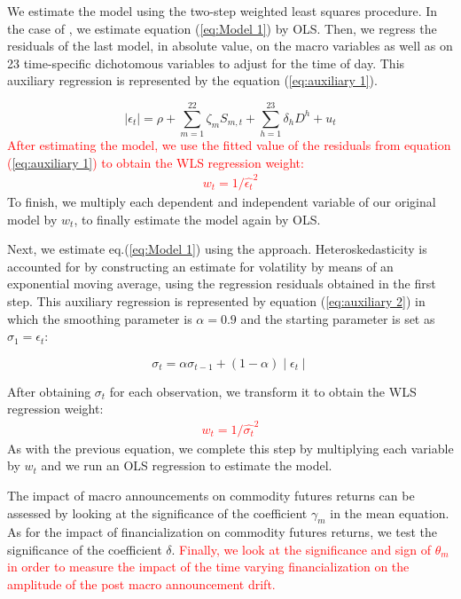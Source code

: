 \documentclass[12pt]{article}
\begin{document}
We estimate the model using the two-step weighted least squares procedure. In the case of \citet{andersen2007real}, we estimate equation (\ref{eq:Model 1}) by OLS. Then, we regress the residuals of the last model, in absolute value, on the macro variables as well as on 23 time-specific dichotomous variables to adjust for the time of day. This auxiliary regression is represented by the equation (\ref{eq:auxiliary 1}).

\begin{equation}\label{eq:auxiliary 1}
\mid \epsilon_{t} \mid=\rho+\sum_{m=1}^{22} \zeta_m S_{m,t}+\sum_{h=1}^{23} \delta_h D^h+u_t
\end{equation}
\textcolor{red}{
After estimating the model, we use the fitted value of the residuals from equation (\ref{eq:auxiliary 1}) to obtain the WLS regression weight:
}
\textcolor{red}{
\begin{align*}
w_t=1/ \hat{\epsilon_t} ^2
\end{align*}
}
To finish, we multiply each dependent and independent variable of our original model by $w_t$, to finally estimate the model again by OLS.

Next, we estimate eq.(\ref{eq:Model 1}) using the \citet{kurov2019price} approach. Heteroskedasticity is accounted for by constructing an estimate for volatility by means of an exponential moving average, using the regression residuals obtained in the first step. This auxiliary regression is represented by equation (\ref{eq:auxiliary 2}) in which the smoothing parameter is $\alpha=0.9$ and the starting parameter is set as $\sigma_1=\epsilon_t$:

\begin{equation}\label{eq:auxiliary 2}
\sigma_t=\alpha \sigma_{t-1}+(1-\alpha) \mid \epsilon_t \mid 
\end{equation} 

After obtaining  $\sigma_t$ for each observation, we transform it to obtain the WLS regression weight:
\textcolor{red}{
\begin{align*}
w_t=1 / \hat{\sigma_t}^2
\end{align*}
}
As with the previous equation, we complete this step by multiplying each variable by  $w_t$ and we run an OLS regression to estimate the model.%

 The impact of macro announcements on commodity futures returns  can be assessed by looking at the significance of the coefficient $\gamma_m$ in the mean equation. As for the impact of financialization on commodity futures returns, we test the significance of the coefficient $\delta$. \textcolor{red}{Finally, we look at the significance and sign of $\theta_m$ in order to measure the impact of the time varying financialization on the amplitude of the post macro announcement drift. }
 
\end{document}
